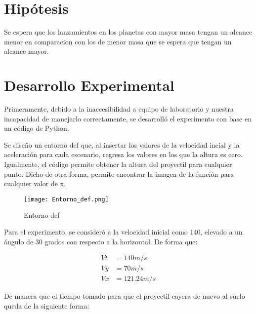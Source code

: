 \documentclass{article}
\begin{document}
\section{Hip\'otesis }
Se espera que los lanzamientos en los planetas con mayor masa tengan un alcance menor en comparacion con los de menor masa que se espera que tengan un alcance mayor.
 
\section{Desarrollo Experimental}
Primeramente, debido a la inaccesibilidad a equipo de laboratorio y nuestra incapacidad de manejarlo correctamente, se desarroll\'o el experimento con base en un código de Python.


Se dise\~no un entorno def que, al insertar los valores de la velocidad incial y la aceleraci\'on para cada escenario, regresa los valores en los que la altura es cero. Igualmente, el c\'odigo permite obtener la altura del proyectil para cualquier punto. Dicho de otra forma, permite encontrar la imagen de la funci\'on para cualquier valor de x.

\begin{figure}[h!]
    \centering
    \texttt{[image: Entorno\_def.png]}
    \caption{Entorno def}
    \label{fig:Entorno_def.}
\end{figure}

Para el experimento, se consideró a la velocidad inicial como 140, elevado a un \'angulo de 30 grados con respecto  a la horizontal. De forma que:

\begin{align*}
    Vt &= 140 m/s\\
    Vy &= 70 m/s\\
    Vx &= 121.24 m/s
\end{align*}

De manera que el tiempo tomado para que el proyectil cayera de nuevo al suelo queda de la siguiente forma:
\end{document}
